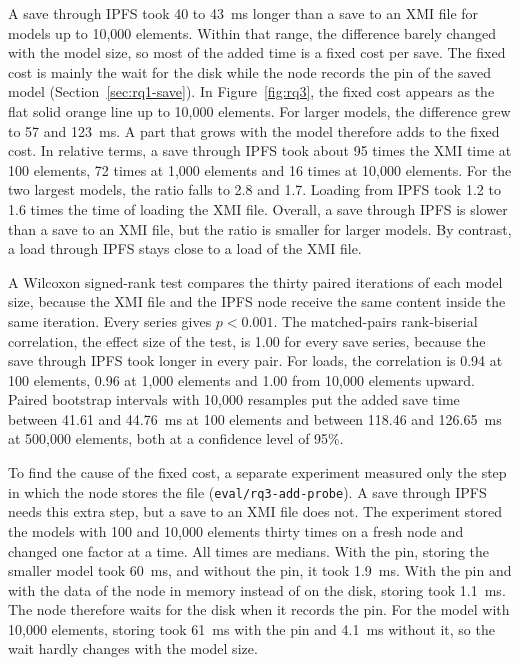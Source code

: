 \documentclass[5p,times,twocolumn]{elsarticle}
\theoremstyle{definition}
\theoremstyle{plain}
\begin{document}
A save through IPFS took 40 to 43~ms longer than a save to an XMI file for models up to 10,000 elements. Within that range, the difference barely changed with the model size, so most of the added time is a fixed cost per save. The fixed cost is mainly the wait for the disk while the node records the pin of the saved model (Section~\ref{sec:rq1-save}). In Figure~\ref{fig:rq3}, the fixed cost appears as the flat solid orange line up to 10,000 elements. For larger models, the difference grew to 57 and 123~ms. A part that grows with the model therefore adds to the fixed cost. In relative terms, a save through IPFS took about 95 times the XMI time at 100 elements, 72 times at 1,000 elements and 16 times at 10,000 elements. For the two largest models, the ratio falls to 2.8 and 1.7. Loading from IPFS took 1.2 to 1.6 times the time of loading the XMI file. Overall, a save through IPFS is slower than a save to an XMI file, but the ratio is smaller for larger models. By contrast, a load through IPFS stays close to a load of the XMI file.

A Wilcoxon signed-rank test compares the thirty paired iterations of each model size, because the XMI file and the IPFS node receive the same content inside the same iteration. Every series gives $p < 0.001$. The matched-pairs rank-biserial correlation, the effect size of the test, is 1.00 for every save series, because the save through IPFS took longer in every pair. For loads, the correlation is 0.94 at 100 elements, 0.96 at 1,000 elements and 1.00 from 10,000 elements upward. Paired bootstrap intervals with 10,000 resamples put the added save time between 41.61 and 44.76~ms at 100 elements and between 118.46 and 126.65~ms at 500,000 elements, both at a confidence level of 95\%.

To find the cause of the fixed cost, a separate experiment measured only the step in which the node stores the file (\texttt{eval/rq3-add-probe}). A save through IPFS needs this extra step, but a save to an XMI file does not. The experiment stored the models with 100 and 10,000 elements thirty times on a fresh node and changed one factor at a time. All times are medians. With the pin, storing the smaller model took 60~ms, and without the pin, it took 1.9~ms. With the pin and with the data of the node in memory instead of on the disk, storing took 1.1~ms. The node therefore waits for the disk when it records the pin. For the model with 10,000 elements, storing took 61~ms with the pin and 4.1~ms without it, so the wait hardly changes with the model size.
\end{document}
